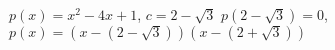 {$p(x) = x^2-4x+1$, $c =2-\sqrt{3}$}
{$p(2-\sqrt{3}) =0$, $p(x) = (x-(2-\sqrt{3}))(x-(2+\sqrt{3})) $}